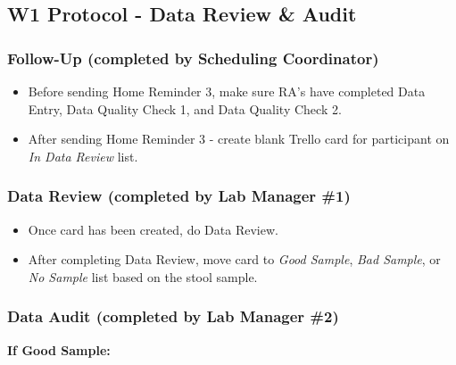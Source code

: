 \documentclass[
]{book}
\providecommand{\tightlist}{%
  \setlength{\itemsep}{0pt}\setlength{\parskip}{0pt}}
\begin{document}
\hypertarget{w1-protocol---data-review-audit}{%
\subsection{W1 Protocol - Data Review \& Audit}\label{w1-protocol---data-review-audit}}

\hypertarget{follow-up-completed-by-scheduling-coordinator}{%
\subsubsection{Follow-Up (completed by Scheduling Coordinator)}\label{follow-up-completed-by-scheduling-coordinator}}

\begin{itemize}
\tightlist
\item
  Before sending Home Reminder 3, make sure RA's have completed Data Entry, Data Quality Check 1, and Data Quality Check 2.
\item
  After sending Home Reminder 3 - create blank Trello card for participant on \emph{In Data Review} list.
\end{itemize}

\hypertarget{data-review-completed-by-lab-manager-1}{%
\subsubsection{Data Review (completed by Lab Manager \#1)}\label{data-review-completed-by-lab-manager-1}}

\begin{itemize}
\tightlist
\item
  Once card has been created, do Data Review.
\item
  After completing Data Review, move card to \emph{Good Sample}, \emph{Bad Sample}, or \emph{No Sample} list based on the stool sample.
\end{itemize}

\hypertarget{data-audit-completed-by-lab-manager-2}{%
\subsubsection{Data Audit (completed by Lab Manager \#2)}\label{data-audit-completed-by-lab-manager-2}}

\textbf{If Good Sample:}
\end{document}
